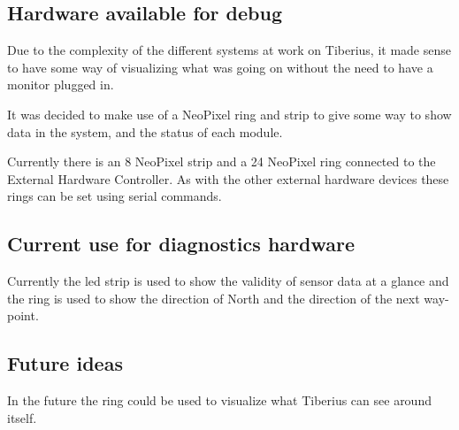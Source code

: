 \subsection{Hardware available for debug}
Due to the complexity of the different systems at work on Tiberius, it made sense to have some way of visualizing what was going on without the need to have a monitor plugged in.

It was decided to make use of a NeoPixel ring and strip to give some way to show data in the system, and the status of each module.

Currently there is an 8 NeoPixel strip and a 24 NeoPixel ring connected to the External Hardware Controller. As with the other external hardware devices these rings can be set using serial commands.

\subsection{Current use for diagnostics hardware}
Currently the led strip is used to show the validity of sensor data at a glance and the ring is used to show the direction of North and the direction of the next way-point.
\subsection{Future ideas}
In the future the ring could be used to visualize what Tiberius can see around itself.
\pagestyle{euan}














